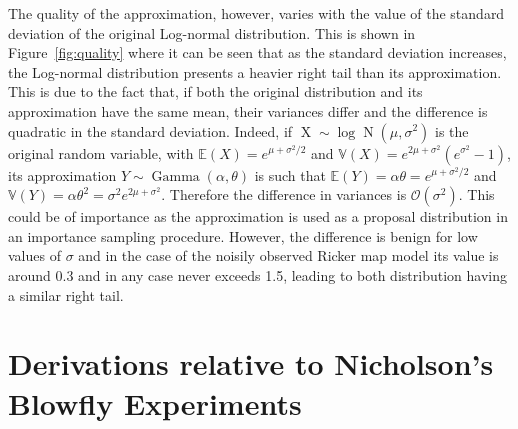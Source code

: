 \documentclass[12pt]{article}
\begin{document}
\begin{appendices}
	The quality of the approximation, however, varies with the value of the standard deviation of the original Log-normal distribution. This is shown in Figure~\ref{fig:quality} where it can be seen that as the standard deviation increases, the Log-normal distribution presents a heavier right tail than its approximation. This is due to the fact that, if both the original distribution and its approximation have the same mean, their variances differ and the difference is quadratic in the standard deviation. Indeed, if $\operatorname{X} \sim \log\operatorname{N}(\mu, \sigma^2)$ is the original random variable, with $\mathbb{E}(X) = e^{\mu+\sigma^2/2}$ and $\mathbb{V}(X) = e^{2\mu+\sigma^2}(e^{\sigma^2}-1)$, its approximation $Y\sim \operatorname{Gamma}(\alpha, \theta)$ is such that $\mathbb{E}(Y) = \alpha\theta = e^{\mu+\sigma^2/2}$ and  $\mathbb{V}(Y) = \alpha\theta^2 = \sigma^2e^{2\mu+\sigma^2}$. Therefore the difference in variances is $\mathcal{O}(\sigma^2)$. This could be of importance as the approximation is used as a proposal distribution in an importance sampling procedure. However, the difference is benign for low values of $\sigma$ and in the case of the noisily observed Ricker map model its value is around 0.3 and in any case never exceeds 1.5, leading to both distribution having a similar right tail.
	
	\section{Derivations relative to Nicholson's Blowfly Experiments} \label{AppendBlowfly}

\end{appendices}
\end{document}
